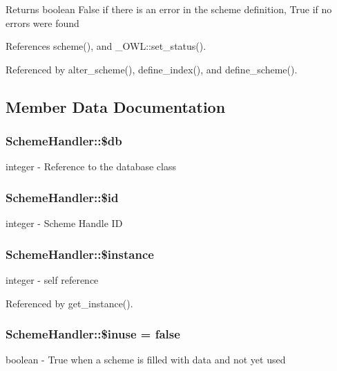 \begin{DoxyReturn}{Returns}
boolean False if there is an error in the scheme definition, True if no errors were found 
\end{DoxyReturn}


References scheme(), and \_\-OWL::set\_\-status().



Referenced by alter\_\-scheme(), define\_\-index(), and define\_\-scheme().



\subsection{Member Data Documentation}
\subsubsection[{\$db}]{\setlength{\rightskip}{0pt plus 5cm}SchemeHandler::\$db}\label{classSchemeHandler_abf3bf26e35b759ccd49f358dedc2dfd1}
integer -\/ Reference to the database class 
\subsubsection[{\$id}]{\setlength{\rightskip}{0pt plus 5cm}SchemeHandler::\$id}\label{classSchemeHandler_af297e966eae06ff1e38a143f93b4aeb9}
integer -\/ Scheme Handle ID 
\subsubsection[{\$instance}]{\setlength{\rightskip}{0pt plus 5cm}SchemeHandler::\$instance}\label{classSchemeHandler_a6f45c52527230b3f3b60d75a9b55e3c1}
integer -\/ self reference 

Referenced by get\_\-instance().

\subsubsection[{\$inuse}]{\setlength{\rightskip}{0pt plus 5cm}SchemeHandler::\$inuse = false}\label{classSchemeHandler_a90e5b04603f86c04b1691b2ddf730104}
boolean -\/ True when a scheme is filled with data and not yet used 

